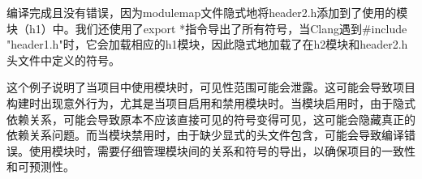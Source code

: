 编译完成且没有错误，因为modulemap文件隐式地将header2.h添加到了使用的模块（h1）中。我们还使用了export *指令导出了所有符号，当Clang遇到\#include "header1.h"时，它会加载相应的h1模块，因此隐式地加载了在h2模块和header2.h头文件中定义的符号。

这个例子说明了当项目中使用模块时，可见性范围可能会泄露。这可能会导致项目构建时出现意外行为，尤其是当项目启用和禁用模块时。当模块启用时，由于隐式依赖关系，可能会导致原本不应该直接可见的符号变得可见，这可能会隐藏真正的依赖关系问题。而当模块禁用时，由于缺少显式的头文件包含，可能会导致编译错误。使用模块时，需要仔细管理模块间的关系和符号的导出，以确保项目的一致性和可预测性。










